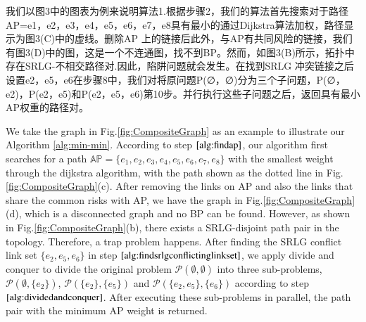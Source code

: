 我们以图3中的图表为例来说明算法1.根据步骤2，我们的算法首先搜索对于路径AP={e1，e2，e3，e4，e5，e6，e7，e8}具有最小的通过Dijkstra算法加权，路径显示为图3(C)中的虚线。删除AP 上的链接后此外，与AP有共同风险的链接，我们有图3(D)中的图，这是一个不连通图，找不到BP。然而，如图3(B)所示，拓扑中存在SRLG-不相交路径对.因此，陷阱问题就会发生。在找到SRLG 冲突链接之后设置{e2，e5，e6}在步骤8中，我们对将原问题P(∅，∅)分为三个子问题，P(∅，{e2})，P({e2}，{e5})和P({e2，e5}，{e6})第10步。并行执行这些子问题之后，返回具有最小AP权重的路径对。


We take the graph in Fig.\ref{fig:CompositeGraph} as an example to illustrate  our Algorithm \ref{alg:min-min}.
According to step $\ref{alg:findap}$, our  algorithm first searches for a path  $\mathbb{AP}=\{e_1,e_2,e_3,e_4,e_5,e_6,e_7,e_8\}$ with the smallest weight through the dijkstra algorithm, with the path shown as the dotted line in Fig.\ref{fig:CompositeGraph}(c). After removing the links on AP and also the links that share the common risks with AP, we have the graph in Fig.\ref{fig:CompositeGraph}(d), which is a disconnected graph and no BP can be found. %
However, as shown in Fig.\ref{fig:CompositeGraph}(b), there exists a SRLG-disjoint path pair in the topology. Therefore, a trap problem happens. After finding the SRLG conflict link set $\{e_2,e_5,e_6\}$ in step $\ref{alg:findsrlgconflictinglinkset}$, we apply divide and conquer to divide the original problem ${\mathcal P}(\emptyset ,\emptyset )$  into three sub-problems, ${\mathcal P}(\emptyset ,\{e_2\} )$, ${\mathcal P}(\{e_2\} ,\{e_5\} )$ and ${\mathcal P}(\{e_2,e_5\} ,\{e_6\} )$ according to step $\ref{alg:dividedandconquer}$. After executing these sub-problems in parallel, the path pair with the minimum AP weight is returned.


